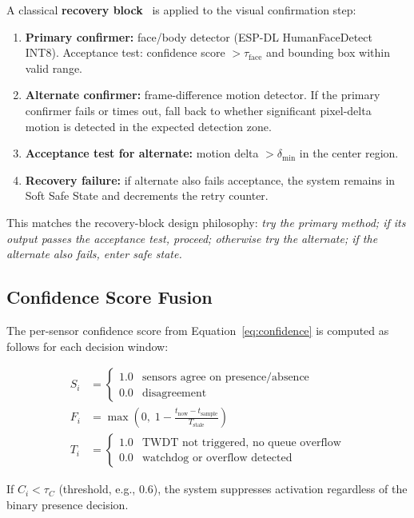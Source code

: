 \documentclass[12pt]{extarticle}
\begin{document}
A classical \textbf{recovery block}~\cite{randell1975} is applied to the visual
confirmation step:

\begin{enumerate}
  \item \textbf{Primary confirmer:} face/body detector (ESP-DL HumanFaceDetect INT8).
        Acceptance test: confidence score $> \tau_{\text{face}}$ and bounding box
        within valid range.
  \item \textbf{Alternate confirmer:} frame-difference motion detector.
        If the primary confirmer fails or times out, fall back to whether significant
        pixel-delta motion is detected in the expected detection zone.
  \item \textbf{Acceptance test for alternate:} motion delta $> \delta_{\min}$ in
        the center region.
  \item \textbf{Recovery failure:} if alternate also fails acceptance, the system
        remains in Soft Safe State and decrements the retry counter.
\end{enumerate}

This matches the recovery-block design philosophy:
\emph{try the primary method; if its output passes the acceptance test, proceed;
otherwise try the alternate; if the alternate also fails, enter safe state.}

\subsection{Confidence Score Fusion}

The per-sensor confidence score from Equation~\ref{eq:confidence} is computed as
follows for each decision window:

\begin{align}
  S_i &= \begin{cases}1.0 & \text{sensors agree on presence/absence}\\0.0 & \text{disagreement}\end{cases}\\
  F_i &= \max\!\left(0,\; 1 - \frac{t_{\text{now}} - t_{\text{sample}}}{T_{\text{stale}}}\right)\\
  T_i &= \begin{cases}1.0 & \text{TWDT not triggered, no queue overflow}\\0.0 & \text{watchdog or overflow detected}\end{cases}
\end{align}

If $C_i < \tau_C$ (threshold, e.g., 0.6), the system suppresses activation regardless
of the binary presence decision.
\end{document}

